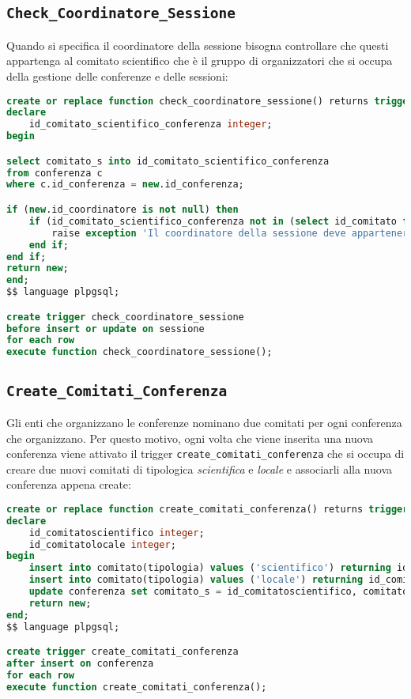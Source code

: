 \subsection{\texttt{Check\_Coordinatore\_Sessione}}\label{trigger:check_coordinatore}
Quando si specifica il coordinatore della sessione bisogna controllare che questi appartenga al comitato scientifico che è il gruppo di organizzatori che si occupa della gestione delle conferenze e delle sessioni:
\begin{lstlisting}[caption={check\_coordinatore\_sessione}, language=sql, style=mystyle]
create or replace function check_coordinatore_sessione() returns trigger as $$
declare 
    id_comitato_scientifico_conferenza integer;
begin

select comitato_s into id_comitato_scientifico_conferenza
from conferenza c
where c.id_conferenza = new.id_conferenza;

if (new.id_coordinatore is not null) then
    if (id_comitato_scientifico_conferenza not in (select id_comitato from organizzatore_comitato where id_organizzatore = new.id_coordinatore))  then
        raise exception 'Il coordinatore della sessione deve appartenere al comitato scientifico della conferenza';
    end if;
end if;
return new;
end;
$$ language plpgsql;

create trigger check_coordinatore_sessione
before insert or update on sessione
for each row
execute function check_coordinatore_sessione();
\end{lstlisting}
\subsection{\texttt{Create\_Comitati\_Conferenza}}
Gli enti che organizzano le conferenze nominano due comitati per ogni conferenza che organizzano. Per questo motivo, ogni volta che viene inserita una nuova conferenza viene attivato il trigger \texttt{create\_comitati\_conferenza} che si occupa di creare due nuovi comitati di tipologica \textit{scientifica} e \textit{locale} e associarli alla nuova conferenza appena create:
\begin{lstlisting}[language=SQL, style=mystyle, caption={\texttt{create\_comitati\_conferenza}}]
create or replace function create_comitati_conferenza() returns trigger as $$
declare 
    id_comitatoscientifico integer;
    id_comitatolocale integer;
begin
    insert into comitato(tipologia) values ('scientifico') returning id_comitato into id_comitatoscientifico;
    insert into comitato(tipologia) values ('locale') returning id_comitato into id_comitatolocale;
    update conferenza set comitato_s = id_comitatoscientifico, comitato_l = id_comitatolocale where id_conferenza = new.id_conferenza;
    return new;
end;
$$ language plpgsql;

create trigger create_comitati_conferenza
after insert on conferenza
for each row
execute function create_comitati_conferenza();
\end{lstlisting}

